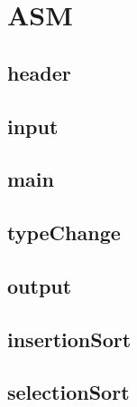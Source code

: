 \section{ASM}
\subsection{header}

\subsection{input}

\subsection{main}

\subsection{typeChange}

\subsection{output}

\subsection{insertionSort}

\subsection{selectionSort}

